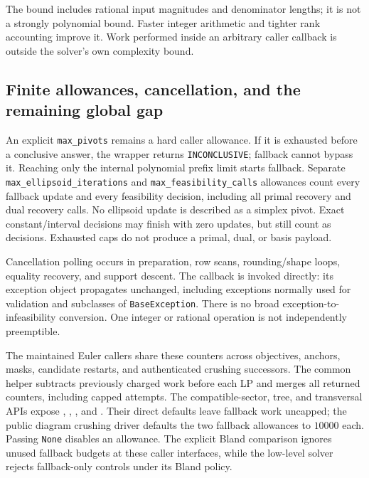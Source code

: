The bound includes rational input magnitudes and denominator lengths; it is
not a strongly polynomial bound.  Faster integer arithmetic and tighter rank
accounting improve it.  Work performed inside an arbitrary caller callback
is outside the solver's own complexity bound.

\subsection{Finite allowances, cancellation, and the remaining global gap}

An explicit \texttt{max\_pivots} remains a hard caller allowance.  If it is
exhausted before a conclusive answer, the wrapper returns
\texttt{INCONCLUSIVE}; fallback cannot bypass it.  Reaching only the internal
polynomial prefix limit starts fallback.  Separate
\texttt{max\_ellipsoid\_iterations} and \texttt{max\_feasibility\_calls}
allowances count every fallback update and every feasibility decision,
including all primal recovery and dual recovery calls.  No ellipsoid update
is described as a simplex pivot.  Exact constant/interval decisions may
finish with zero updates, but still count as decisions.  Exhausted caps do
not produce a primal, dual, or basis payload.

Cancellation polling occurs in preparation, row scans, rounding/shape loops,
equality recovery, and support descent.  The callback is invoked directly:
its exception object propagates unchanged, including exceptions normally used
for validation and subclasses of \texttt{BaseException}.  There is no broad
exception-to-infeasibility conversion.  One integer or rational operation
is not independently preemptible.

The maintained Euler callers share these counters across objectives,
anchors, masks, candidate restarts, and authenticated crushing successors.
The common  helper subtracts previously charged
work before each LP and merges all returned counters, including capped
attempts.  The compatible-sector, tree, and transversal APIs expose
, ,
, and .
Their direct defaults leave fallback work uncapped; the public diagram
crushing driver defaults the two fallback allowances to $10000$ each.
Passing \texttt{None} disables an allowance.  The explicit Bland comparison
ignores unused fallback budgets at these caller interfaces, while the
low-level solver rejects fallback-only controls under its Bland policy.

